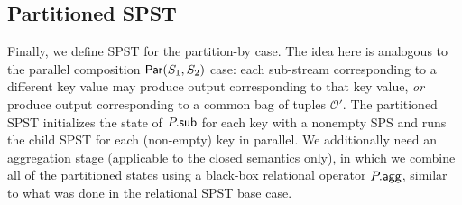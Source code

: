 

\subsection{Partitioned SPST}

Finally, we define SPST for the partition-by case.
The idea here is analogous to the parallel composition $\mathsf{Par}({S_1}, {S_2})$ case: each sub-stream corresponding to a different key value may produce output corresponding to that key value, \emph{or} produce output corresponding to a common bag of tuples $\mathcal{O}'$.
The partitioned SPST initializes the state of ${P}.{\mathsf{sub}}$ for each key with a nonempty SPS and runs the child SPST for each (non-empty) key in parallel.
We additionally need an aggregation stage (applicable to the closed semantics only),
in which we combine all of the partitioned states
using a black-box relational operator ${P}.{\mathsf{agg}}$,
similar to what was done in the relational SPST base case.

